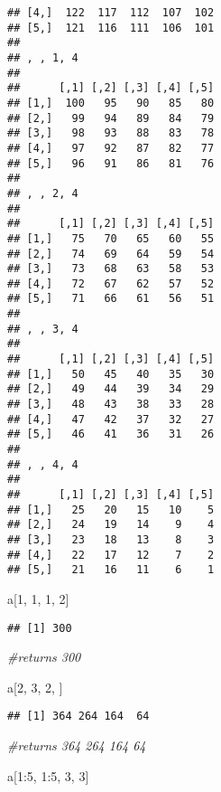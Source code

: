 \documentclass[
]{article}
\newenvironment{Shaded}{\begin{snugshade}}{\end{snugshade}}
\newcommand{\CommentTok}[1]{\textcolor[rgb]{0.56,0.35,0.01}{\textit{#1}}}
\newcommand{\DecValTok}[1]{\textcolor[rgb]{0.00,0.00,0.81}{#1}}
\newcommand{\NormalTok}[1]{#1}
\newcommand{\SpecialCharTok}[1]{\textcolor[rgb]{0.00,0.00,0.00}{#1}}
\begin{document}
\begin{verbatim}
## [4,]  122  117  112  107  102
## [5,]  121  116  111  106  101
## 
## , , 1, 4
## 
##      [,1] [,2] [,3] [,4] [,5]
## [1,]  100   95   90   85   80
## [2,]   99   94   89   84   79
## [3,]   98   93   88   83   78
## [4,]   97   92   87   82   77
## [5,]   96   91   86   81   76
## 
## , , 2, 4
## 
##      [,1] [,2] [,3] [,4] [,5]
## [1,]   75   70   65   60   55
## [2,]   74   69   64   59   54
## [3,]   73   68   63   58   53
## [4,]   72   67   62   57   52
## [5,]   71   66   61   56   51
## 
## , , 3, 4
## 
##      [,1] [,2] [,3] [,4] [,5]
## [1,]   50   45   40   35   30
## [2,]   49   44   39   34   29
## [3,]   48   43   38   33   28
## [4,]   47   42   37   32   27
## [5,]   46   41   36   31   26
## 
## , , 4, 4
## 
##      [,1] [,2] [,3] [,4] [,5]
## [1,]   25   20   15   10    5
## [2,]   24   19   14    9    4
## [3,]   23   18   13    8    3
## [4,]   22   17   12    7    2
## [5,]   21   16   11    6    1
\end{verbatim}

\begin{Shaded}
\begin{Highlighting}[]
\NormalTok{a[}\DecValTok{1}\NormalTok{, }\DecValTok{1}\NormalTok{, }\DecValTok{1}\NormalTok{, }\DecValTok{2}\NormalTok{]}
\end{Highlighting}
\end{Shaded}

\begin{verbatim}
## [1] 300
\end{verbatim}

\begin{Shaded}
\begin{Highlighting}[]
\CommentTok{\#returns 300}

\NormalTok{a[}\DecValTok{2}\NormalTok{, }\DecValTok{3}\NormalTok{, }\DecValTok{2}\NormalTok{, ]}
\end{Highlighting}
\end{Shaded}

\begin{verbatim}
## [1] 364 264 164  64
\end{verbatim}

\begin{Shaded}
\begin{Highlighting}[]
\CommentTok{\#returns 364 264 164  64}

\NormalTok{a[}\DecValTok{1}\SpecialCharTok{:}\DecValTok{5}\NormalTok{, }\DecValTok{1}\SpecialCharTok{:}\DecValTok{5}\NormalTok{, }\DecValTok{3}\NormalTok{, }\DecValTok{3}\NormalTok{]}
\end{Highlighting}
\end{Shaded}
\end{document}
